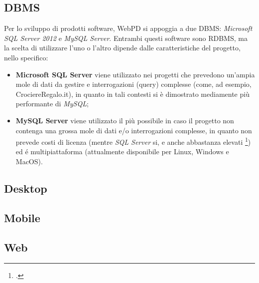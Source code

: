\subsection{DBMS}
Per lo sviluppo di prodotti software, WebPD si appoggia a due DBMS: \textit{Microsoft SQL Server 2012} e \textit{MySQL Server}. Entrambi questi software sono RDBMS, ma la scelta di utilizzare l'uno o l'altro dipende dalle caratteristiche del progetto, nello specifico: \begin{itemize}
	\item \textbf{Microsoft SQL Server} viene utilizzato nei progetti che prevedono un'ampia mole di dati da gestire e interrogazioni (query) complesse (come, ad esempio, CrociereRegalo.it), in quanto in tali contesti si è dimostrato mediamente più performante di \textit{MySQL};
	\item \textbf{MySQL Server} viene utilizzato il più possibile in caso il progetto non contenga una grossa mole di dati e/o interrogazioni complesse, in quanto non prevede costi di licenza (mentre \textit{SQL Server} si, e anche abbastanza elevati \footcite{site:sql-server-pricing}) ed é multipiattaforma (attualmente disponibile per Linux, Windows e MacOS).
\end{itemize}

\subsection{Desktop}

\subsection{Mobile}

\subsection{Web}
